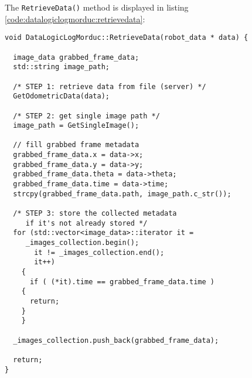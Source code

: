 The \texttt{RetrieveData()} method is displayed in listing
\ref{code:datalogiclogmorduc:retrievedata}:
\\
\begin{lstlisting}[caption={\texttt{DataLogicLogMorduc::RetrieveData()} method},
    label={code:datalogiclogmorduc:retrievedata}]
void DataLogicLogMorduc::RetrieveData(robot_data * data) {

  image_data grabbed_frame_data;
  std::string image_path;

  /* STEP 1: retrieve data from file (server) */
  GetOdometricData(data);

  /* STEP 2: get single image path */
  image_path = GetSingleImage();
   
  // fill grabbed frame metadata
  grabbed_frame_data.x = data->x;
  grabbed_frame_data.y = data->y;
  grabbed_frame_data.theta = data->theta;
  grabbed_frame_data.time = data->time;
  strcpy(grabbed_frame_data.path, image_path.c_str());

  /* STEP 3: store the collected metadata
     if it's not already stored */
  for (std::vector<image_data>::iterator it =
	 _images_collection.begin();
       it != _images_collection.end();
       it++)
    {
      if ( (*it).time == grabbed_frame_data.time )
	{
	  return;
	}
    }

  _images_collection.push_back(grabbed_frame_data);
  
  return;
}
\end{lstlisting}

